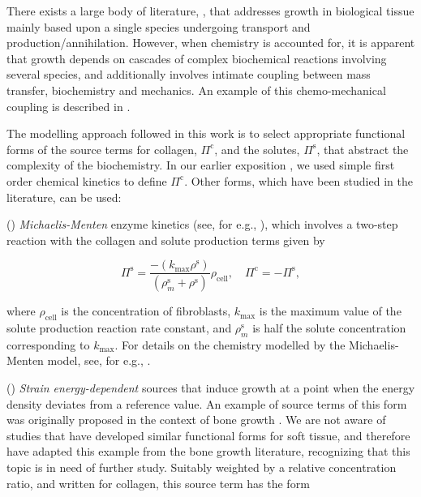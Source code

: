 There exists a large body of literature,
\citep{CowinHegedus:76,EpsteinMaugin:2000,AmbrosiMollica:2002}, that
addresses growth in biological tissue mainly based upon a single
species undergoing transport and production/annihilation. However,
when chemistry is accounted for, it is apparent that growth depends on
cascades of complex biochemical reactions involving several species,
and additionally involves intimate coupling between mass transfer,
biochemistry and mechanics. An example of this chemo-mechanical
coupling is described in \cite{Provenzanoetal:2003}.

The modelling approach followed in this work is to select appropriate
functional forms of the source terms for collagen, $\Pi^{\mathrm{c}}$,
and the solutes, $\Pi^{\mathrm{s}}$, that abstract the complexity of
the biochemistry. In our earlier exposition \citep{growthpaper}, we
used simple first order chemical kinetics to define
$\Pi^{\mathrm{c}}$. Other forms, which have been studied in the
literature, can be used: 

() {\em Michaelis-Menten}
enzyme kinetics (see, for 
e.g., \cite{Sengersetal:2004}), which involves a two-step reaction
with the collagen and solute production terms given by

\begin{equation}
\Pi^\mathrm{s} =
    \frac{-(k_{\mathrm{max}}\rho^{\mathrm{s}})}
    {(\rho^{\mathrm{s}}_m+\rho^{\mathrm{s}})}
    \rho_{\mathrm{cell}}, \quad\Pi^\mathrm{c} = -\Pi^\mathrm{s},
\label{enzymekineticseq}
\end{equation}

\noindent where $\rho_{\mathrm{cell}}$ is the concentration of
fibroblasts, $k_{\mathrm{max}}$ is the maximum value of the solute
production reaction rate constant, and $\rho^{\mathrm{s}}_m$ is half
the solute concentration corresponding to $k_{\mathrm{max}}$. For
details on the chemistry modelled by the Michaelis-Menten model, see,
for e.g., \citet{sbromadill}.

() {\em Strain energy-dependent} sources that
induce growth at a point when the 
energy density deviates from a reference value. An example of source terms
of this form was
originally proposed in the context of bone growth 
\citep{HarriganHamilton:93}. We are not aware of studies that have
developed similar functional forms for soft tissue, and therefore have
adapted this example from the bone growth literature, recognizing that
this topic is in need of further study. Suitably weighted by a
relative concentration ratio, and written for collagen, this source
term has the form 

